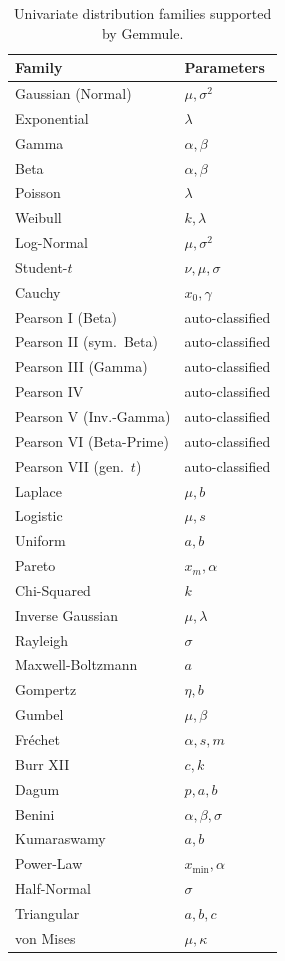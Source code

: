 ﻿\documentclass[10pt,twocolumn]{article}
\begin{document}
\begin{table}[H]
\centering
\caption{Univariate distribution families supported by Gemmule.}
\label{tab:families}
\small
\begin{tabular}{ll}
\toprule
\textbf{Family} & \textbf{Parameters} \\
\midrule
Gaussian (Normal)       & $\mu, \sigma^2$ \\
Exponential             & $\lambda$ \\
Gamma                   & $\alpha, \beta$ \\
Beta                    & $\alpha, \beta$ \\
Poisson                 & $\lambda$ \\
Weibull                 & $k, \lambda$ \\
Log-Normal              & $\mu, \sigma^2$ \\
Student-$t$             & $\nu, \mu, \sigma$ \\
Cauchy                  & $x_0, \gamma$ \\
Pearson I (Beta)        & auto-classified \\
Pearson II (sym.\ Beta) & auto-classified \\
Pearson III (Gamma)     & auto-classified \\
Pearson IV              & auto-classified \\
Pearson V (Inv.-Gamma)  & auto-classified \\
Pearson VI (Beta-Prime) & auto-classified \\
Pearson VII (gen.\ $t$) & auto-classified \\
Laplace                 & $\mu, b$ \\
Logistic                & $\mu, s$ \\
Uniform                 & $a, b$ \\
Pareto                  & $x_m, \alpha$ \\
Chi-Squared             & $k$ \\
Inverse Gaussian        & $\mu, \lambda$ \\
Rayleigh                & $\sigma$ \\
Maxwell-Boltzmann       & $a$ \\
Gompertz                & $\eta, b$ \\
Gumbel                  & $\mu, \beta$ \\
Fr\'{e}chet             & $\alpha, s, m$ \\
Burr XII                & $c, k$ \\
Dagum                   & $p, a, b$ \\
Benini                  & $\alpha, \beta, \sigma$ \\
Kumaraswamy             & $a, b$ \\
Power-Law               & $x_{\min}, \alpha$ \\
Half-Normal             & $\sigma$ \\
Triangular              & $a, b, c$ \\
von Mises               & $\mu, \kappa$ \\
\bottomrule
\end{tabular}
\end{table}
\end{document}
